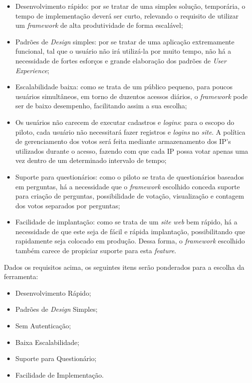 \begin{itemize}
    \item Desenvolvimento rápido: por se tratar de uma simples solução, temporária, o tempo de implementação deverá
        ser curto, relevando o requisito de utilizar um \textit{framework} de alta produtividade de forma escalável;
    \item Padrões de \textit{Design} simples: por se tratar de uma aplicação extremamente funcional, tal que o usuário não irá
        utilizá-la por muito tempo, não há a necessidade de fortes esforços e grande elaboração dos padrões de
        \textit{User} \textit{Experience};
    \item Escalabilidade baixa: como se trata de um público pequeno, para poucos usuários simultâneos, em torno de duzentos
        acessos diários, o \textit{framework} pode ser de baixo desempenho, facilitando assim a sua escolha;
    \item Os usuários não carecem de executar cadastros e \textit{logins}: para o escopo do piloto, cada usuário não necessitará
        fazer registros e \textit{logins} no \textit{site}. A política de gerenciamento dos votos será feita mediante armazenamento dos
        IP's utilizados durante o acesso, fazendo com que cada IP possa votar apenas uma vez dentro de um determinado
        intervalo de tempo;
    \item Suporte para questionários: como o piloto se trata de questionários baseados em perguntas, há a necessidade que o \textit{framework}
        escolhido conceda suporte para criação de perguntas, possibilidade de votação, visualização e contagem dos votos
        separados por perguntas;
    \item Facilidade de implantação: como se trata de um \textit{site} \textit{web} bem rápido, há a necessidade de que este seja de fácil e rápida
        implantação, possibilitando que rapidamente seja colocado em produção. Dessa forma, o \textit{framework} escolhido também carece
        de propiciar suporte para esta \textit{feature}.
\end{itemize}

Dados os requisitos acima, os seguintes itens serão ponderados para a escolha da ferramenta:
\begin{itemize}
    \item Desenvolvimento Rápido;
    \item Padrões de \textit{Design} Simples;
    \item Sem Autenticação;
    \item Baixa Escalabilidade;
    \item Suporte para Questionário;
    \item Facilidade de Implementação.
\end{itemize}

